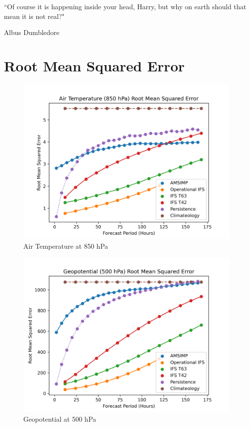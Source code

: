 \epigraph{``Of course it is happening inside your head, Harry, but why on earth should that mean it is not real?"}{Albus Dumbledore}

\section{Root Mean Squared Error}
\begin{figure}[H]
    \centering
    \includegraphics[width=.7\linewidth]{Plots/Results/Temperature/root_mean_squared_error.png}
    \caption{Air Temperature at 850 hPa}
\end{figure}

\begin{figure}[H]
    \centering
    \includegraphics[width=.7\linewidth]{Plots/Results/Geopotential/root_mean_squared_error.png}
    \caption{Geopotential at 500 hPa}
\end{figure}

